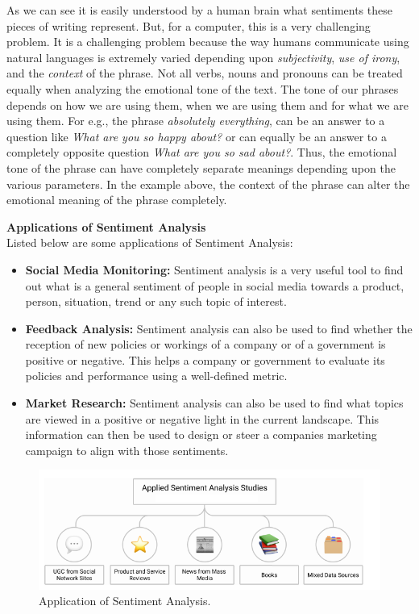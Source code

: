 \documentclass[a4paper, 12pt]{article}
\begin{document}
\begin{sloppypar}
As we can see it is easily understood by a human brain what sentiments these pieces of writing represent. But, for a computer, this is a very challenging problem. It is a challenging problem because the way humans communicate using natural languages is extremely varied depending  upon \textit{subjectivity}, \textit{use of irony}, and the \textit{context} of the phrase. Not all verbs, nouns and pronouns can be treated equally when analyzing the emotional tone of the text. The tone of our phrases depends on how we are using them, when we are using them and for what we are using them. For e.g., the phrase \textit{absolutely everything}, can be an answer to a question like \textit{What are you so happy about?} or can equally be an answer to a completely opposite  question \textit{What are you so sad about?}. Thus, the emotional tone of the phrase can have completely separate meanings depending upon the various parameters. In the example above, the context of the phrase can alter the emotional meaning of the phrase completely. 

\large \textbf{Applications of Sentiment Analysis} \\[0.5ex]
\normalsize
Listed below are some applications of Sentiment Analysis:
\begin{itemize}
\item{
\textbf{Social Media Monitoring: } Sentiment analysis is a very useful tool to find out what is a general sentiment of people in social media towards a product, person, situation, trend or any such topic of interest.}
\item{
\textbf{Feedback Analysis: } Sentiment analysis can also be used to find whether the  reception of new policies or workings of a company or of a government is positive or negative. This helps a company or government to evaluate its policies and performance using a well-defined metric.}
\item{
\textbf{Market Research: } Sentiment analysis can also be used to find what topics are viewed in a positive or negative light in the current landscape. This information can then be used to design or steer a companies marketing campaign to align with those sentiments.}
\end{itemize}


\begin{figure}[H]
\begin{center}
\includegraphics[scale=0.7]{cat.png}
\caption{Application of Sentiment Analysis.\cite{smetanin_applications_2020} \label{cat}}
\end{center}
\end{figure}


\end{sloppypar}
\end{document}

